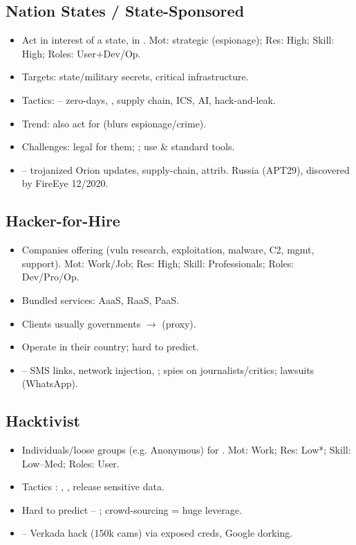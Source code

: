 \subsection{Nation States / State-Sponsored}
\begin{itemize}
\item Act in interest of a state, in . Mot: strategic (espionage); Res: High; Skill: High; Roles: User+Dev/Op.
\item Targets: state/military secrets, critical infrastructure.
\item Tactics:  -- zero-days, , supply chain, ICS, AI, hack-and-leak.
\item Trend: also act for  (blurs espionage/crime).
\item Challenges: legal for them; ; use  \& standard tools.
\item {} -- trojanized Orion updates, supply-chain, attrib. Russia (APT29), discovered by FireEye 12/2020.
\end{itemize}

\subsection{Hacker-for-Hire}
\begin{itemize}
\item Companies offering  (vuln research, exploitation, malware, C2, mgmt, support). Mot: Work/Job; Res: High; Skill: Professionals; Roles: Dev/Pro/Op.
\item Bundled services: AaaS, RaaS, PaaS.
\item Clients usually governments $\to$  (proxy).
\item Operate  in their country; hard to predict.
\item {} -- SMS links, network injection, ; spies on journalists/critics; lawsuits (WhatsApp).
\end{itemize}

\subsection{Hacktivist}
\begin{itemize}
\item Individuals/loose groups (e.g. Anonymous) for . Mot: Work; Res: Low*; Skill: Low--Med; Roles: User.
\item Tactics : , , release sensitive data.
\item Hard to predict -- ; crowd-sourcing = huge leverage.
\item {} -- Verkada hack (150k cams) via exposed creds, Google dorking.
\end{itemize}

